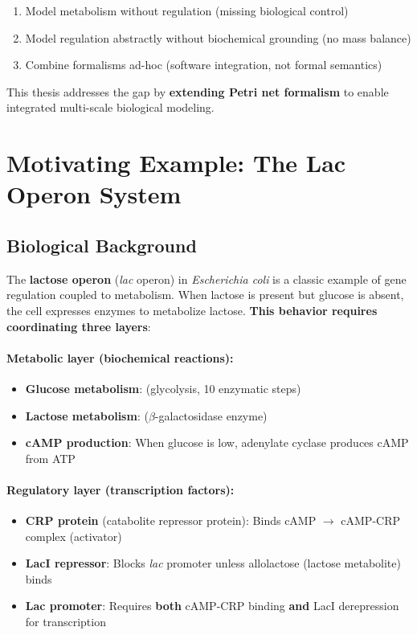 \begin{enumerate}
    \item Model metabolism without regulation (missing biological control)
    \item Model regulation abstractly without biochemical grounding (no mass balance)
    \item Combine formalisms ad-hoc (software integration, not formal semantics)
\end{enumerate}

This thesis addresses the gap by \textbf{extending Petri net formalism} to enable integrated multi-scale biological modeling.

\section{Motivating Example: The Lac Operon System}
\label{sec:lac-operon-motivation}

\subsection{Biological Background}
\label{subsec:lac-operon-biology}

The \textbf{lactose operon} (\emph{lac} operon) in \emph{Escherichia coli} is a classic example of gene regulation coupled to metabolism. When lactose is present but glucose is absent, the cell expresses enzymes to metabolize lactose. \textbf{This behavior requires coordinating three layers}:

\paragraph{Metabolic layer (biochemical reactions):}
\begin{itemize}
    \item \textbf{Glucose metabolism}:  (glycolysis, 10 enzymatic steps)
    \item \textbf{Lactose metabolism}:  ($\beta$-galactosidase enzyme)
    \item \textbf{cAMP production}: When glucose is low, adenylate cyclase produces cAMP from ATP
\end{itemize}

\paragraph{Regulatory layer (transcription factors):}
\begin{itemize}
    \item \textbf{CRP protein} (catabolite repressor protein): Binds cAMP $\to$ cAMP-CRP complex (activator)
    \item \textbf{LacI repressor}: Blocks \emph{lac} promoter unless allolactose (lactose metabolite) binds
    \item \textbf{Lac promoter}: Requires \textbf{both} cAMP-CRP binding \textbf{and} LacI derepression for transcription
\end{itemize}

